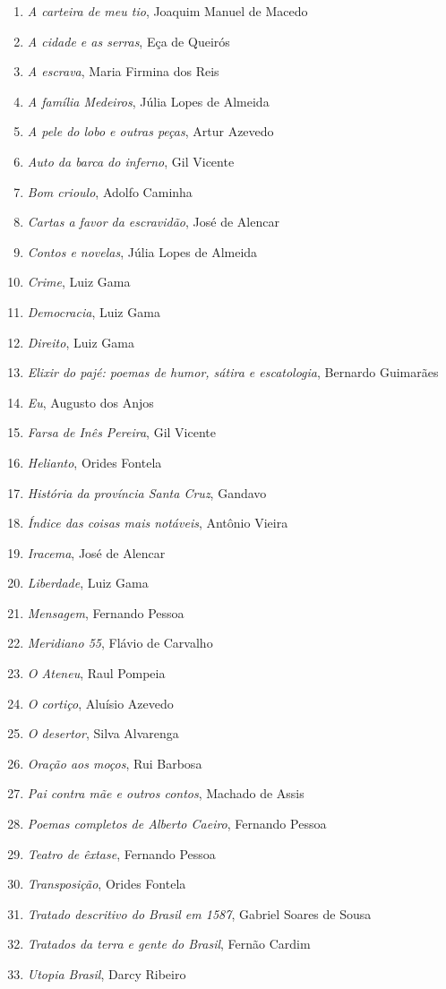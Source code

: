 \begin{enumerate}
\setlength{\topsep}{2pt}
\setlength{\partopsep}{0pt}
\setlength\parskip{4.2pt}
\setlength\itemsep{-1.4mm}
\item \textit{A carteira de meu tio}, Joaquim Manuel de Macedo
\item \textit{A cidade e as serras}, Eça de Queirós
\item \textit{A escrava}, Maria Firmina dos Reis
\item \textit{A família Medeiros}, Júlia Lopes de Almeida 
\item \textit{A pele do lobo e outras peças}, Artur Azevedo
\item \textit{Auto da barca do inferno}, Gil Vicente
\item \textit{Bom crioulo}, Adolfo Caminha
\item \textit{Cartas a favor da escravidão}, José de Alencar
\item \textit{Contos e novelas}, Júlia Lopes de Almeida
\item \textit{Crime}, Luiz Gama
\item \textit{Democracia}, Luiz Gama
\item \textit{Direito}, Luiz Gama
\item \textit{Elixir do pajé: poemas de humor, sátira e escatologia}, Bernardo Guimarães
\item \textit{Eu}, Augusto dos Anjos
\item \textit{Farsa de Inês Pereira}, Gil Vicente
\item \textit{Helianto}, Orides Fontela
\item \textit{História da província Santa Cruz}, Gandavo
\item \textit{Índice das coisas mais notáveis}, Antônio Vieira
\item \textit{Iracema}, José de Alencar
\item \textit{Liberdade}, Luiz Gama
\item \textit{Mensagem}, Fernando Pessoa
\item \textit{Meridiano 55}, Flávio de Carvalho
\item \textit{O Ateneu}, Raul Pompeia
\item \textit{O cortiço}, Aluísio Azevedo
\item \textit{O desertor}, Silva Alvarenga
\item \textit{Oração aos moços}, Rui Barbosa
\item \textit{Pai contra mãe e outros contos}, Machado de Assis
\item \textit{Poemas completos de Alberto Caeiro}, Fernando Pessoa
\item \textit{Teatro de êxtase}, Fernando Pessoa
\item \textit{Transposição}, Orides Fontela
\item \textit{Tratado descritivo do Brasil em 1587}, Gabriel Soares de Sousa
\item \textit{Tratados da terra e gente do Brasil}, Fernão Cardim 
\item \textit{Utopia Brasil}, Darcy Ribeiro
\end{enumerate}




